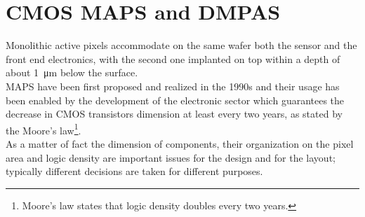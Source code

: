 \section{CMOS MAPS and DMPAS}
   Monolithic active pixels accommodate on the same wafer both the sensor and the front end electronics, with the second one implanted on top within a depth of about \SI{1}{\um} below the surface. \\
   MAPS have been first proposed and realized in the 1990s and their usage has been enabled by the development of the electronic sector which guarantees the decrease in CMOS transistors dimension at least every two years, as stated by the Moore's law\footnote{Moore's law states that logic density doubles every two years.}.\\
   As a matter of fact the dimension of components, their organization on the pixel area and logic density are important issues for the design and for the layout; typically different decisions are taken for different purposes.

